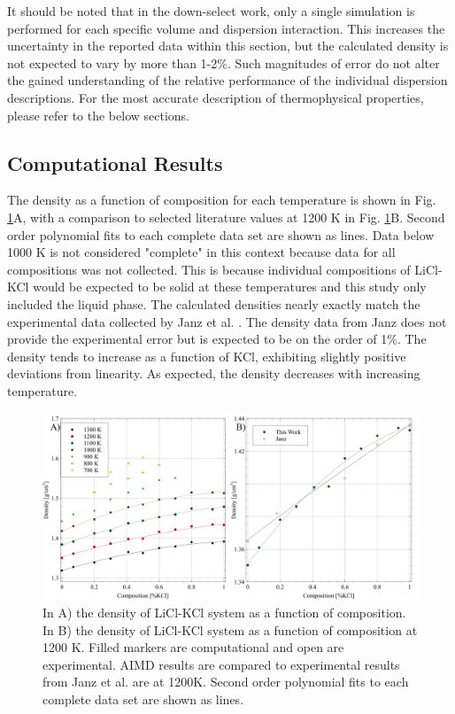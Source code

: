 \documentclass[review]{elsarticle}
\begin{document}
It should be noted that in the down-select work, only a single simulation is performed for each specific volume and dispersion interaction. This increases the uncertainty in the reported data within this section, but the calculated density is not expected to vary by more than 1-2\%. Such magnitudes of error do not alter the gained understanding of the relative performance of the individual dispersion descriptions. For the most accurate description of thermophysical properties, please refer to the below sections. 

\FloatBarrier

\subsection{Computational Results}

The density as a function of composition for each temperature is shown in Fig. \ref{fig:density}A, with a comparison to selected literature values at 1200 K in Fig. \ref{fig:density}B. Second order polynomial fits to each complete data set are shown as lines. Data below 1000 K is not considered "complete" in this context because data for all compositions was not collected. This is because individual compositions of LiCl-KCl would be expected to be solid at these temperatures and this study only included the liquid phase. The calculated densities nearly exactly match the experimental data collected by Janz et al. \cite{janz1975molten,van1955electrical}. The density data from Janz does not provide the experimental error but is expected to be on the order of 1\%. The density tends to increase as a function of KCl, exhibiting slightly positive deviations from linearity. As expected, the density decreases with increasing temperature.  

\begin{figure}[h]
 \centering
 \includegraphics[width=1.0\textwidth]{images/denisty_combined_figures.jpg} 
 \caption{In A) the density of LiCl-KCl system as a function of composition. In B) the density of LiCl-KCl system as a function of composition at 1200 K. Filled markers are computational and open are experimental. AIMD results are compared to experimental results from Janz et al. \cite{janz1975molten,van1955electrical} are at 1200K. Second order polynomial fits to each complete data set are shown as lines.}
 \label{fig:density}
\end{figure} 
\end{document}
